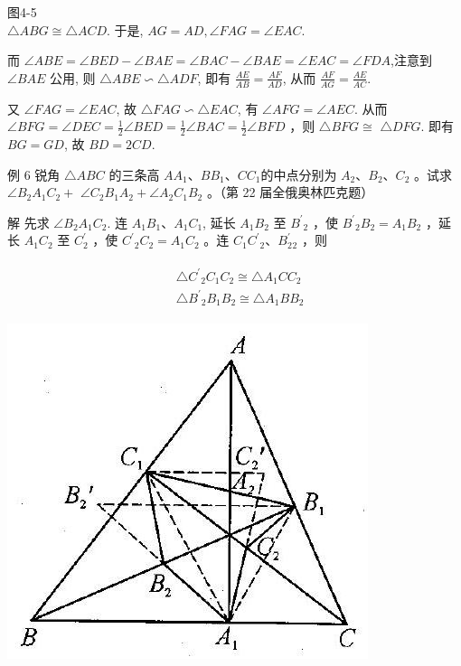 \documentclass[10pt]{article}
\begin{document}
图4-5\\
$\triangle A B G \cong \triangle A C D$. 于是, $A G=A D, \angle F A G=\angle E A C$.

而 $\angle A B E=\angle B E D-\angle B A E=\angle B A C-\angle B A E=\angle E A C=\angle F D A$,注意到 $\angle B A E$ 公用, 则 $\triangle A B E \backsim \triangle A D F$, 即有 $\frac{A E}{A B}=\frac{A F}{A D}$, 从而 $\frac{A F}{A G}=\frac{A E}{A C}$.

又 $\angle F A G=\angle E A C$, 故 $\triangle F A G \backsim \triangle E A C$, 有 $\angle A F G=\angle A E C$. 从而 $\angle B F G=\angle D E C=\frac{1}{2} \angle B E D=\frac{1}{2} \angle B A C=\frac{1}{2} \angle B F D$ ，则 $\triangle B F G \cong$ $\triangle D F G$. 即有 $B G=G D$, 故 $B D=2 C D$.

例 6 锐角 $\triangle A B C$ 的三条高 $A A_{1} 、 B B_{1} 、 C C_{1}$的中点分别为 $A_{2} 、 B_{2} 、 C_{2}$ 。试求 $\angle B_{2} A_{1} C_{2}+$ $\angle C_{2} B_{1} A_{2}+\angle A_{2} C_{1} B_{2}$ 。（第 22 届全俄奥林匹克题）

解 先求 $\angle B_{2} A_{1} C_{2}$. 连 $A_{1} B_{1} 、 A_{1} C_{1}$, 延长 $A_{1} B_{2}$ 至 $B^{\prime}{ }_{2}$ ，使 $B^{\prime}{ }_{2} B_{2}=A_{1} B_{2}$ ，延长 $A_{1} C_{2}$ 至 $C_{2}^{\prime}$ ，使 $C^{\prime}{ }_{2} C_{2}=A_{1} C_{2}$ 。连 $C_{1} C^{\prime}{ }_{2} 、 B_{2}^{\prime}{ }_{2}$ ，则

\begin{align*}
\begin{aligned}
& \triangle C^{\prime}{ }_{2} C_{1} C_{2} \cong \triangle A_{1} C C_{2} \\
& \triangle B^{\prime}{ }_{2} B_{1} B_{2} \cong \triangle A_{1} B B_{2}
\end{aligned}
\end{align*}

\begin{center}
\includegraphics[max width=\textwidth]{2024_10_30_2c8f45efd4a519b08e1ag-039}
\end{center}
\end{document}
